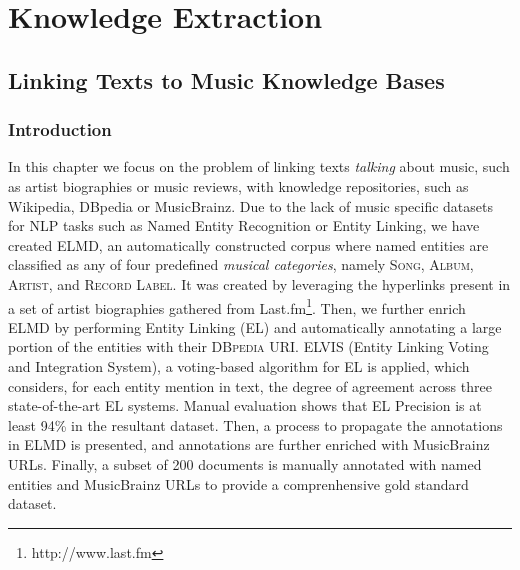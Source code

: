 \part{Knowledge Extraction}
\label{part:knowledge-extraction}

\chapter{Linking Texts to Music Knowledge Bases}
\label{sec:linking}


\section{Introduction}
\label{sec:linking:intro}

In this chapter we focus on the problem of linking texts \textit{talking} about music, such as artist biographies or music reviews, with knowledge repositories, such as Wikipedia, DBpedia or MusicBrainz. Due to the lack of music specific datasets for NLP tasks such as Named Entity Recognition or Entity Linking, we have created \textsc{ELMD}, an automatically constructed corpus where named entities are classified as any of four predefined \textit{musical categories}, namely \textsc{Song}, \textsc{Album}, \textsc{Artist}, and \textsc{Record Label}. It was created by leveraging the hyperlinks present in a set of artist biographies gathered from Last.fm\footnote{http://www.last.fm}. Then, we further enrich \textsc{ELMD} by performing Entity Linking (EL) and automatically annotating a large portion of the entities with their \textsc{DBpedia} URI. \textsc{ELVIS} (Entity Linking Voting and Integration System), a voting-based algorithm for EL is applied, which considers, for each entity mention in text, the degree of agreement across three state-of-the-art EL systems. 
Manual evaluation shows that EL Precision is at least 94\% in the resultant dataset.
Then, a process to propagate the annotations in \textsc{ELMD} is presented, and annotations are further enriched with MusicBrainz URLs.
Finally, a subset of 200 documents is manually annotated with named entities and MusicBrainz URLs to provide a comprenhensive gold standard dataset. 


